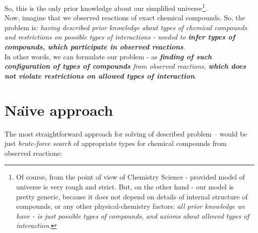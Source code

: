 \documentclass[10pt]{article}
\begin{document}
So, this is the only prior knowledge about our simplified universe\footnote{Of course, from the point of view of Chemistry Science - provided model of universe is very rough and strict. But, on the other hand - our model is pretty generic, because it does not depend on details of internal structure of compounds, or any other physical-chemistry factors: \emph{all prior knowledge we have - is just possible types of compounds, and axioms about allowed types of interaction}.}.\\

Now, imagine that we observed reactions of exact chemical compounds.
So, the problem is: \textsl{having described prior knowledge about types of chemical compounds and restrictions on possible types of interactions - needed to \textbf{infer types of compounds, which participate in observed reactions}}. \\

In other words, we can formulate our problem - as \textsl{\textbf{finding of such configuration of types of compounds} from observed reactions, \textbf{which does not violate restrictions on allowed types of interaction}}.

\newpage

\section{Na\"{\i}ve approach}
The most straightforward approach for solving of described problem -- would be just \emph{brute-force search} of appropriate types for chemical compounds from observed reactions:
\end{document}
